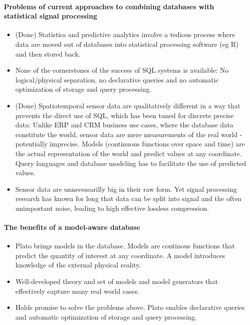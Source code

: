 \paragraph{Problems of current approaches to combining databases with statistical signal processing}
\begin{itemize}
\item (Done) Statistics and predictive analytics involve a tedious process where data are moved out of databases into statistical processing software (eg R) and then stored back.
%
\item None of the cornerstones of the success of SQL systems is available: No logical/physical separation, no declarative queries and no automatic optimization of storage and query processing.
%
\item (Done) Spatiotemporal sensor data are qualitatively different in a way that prevents the direct use of SQL, which has been tuned for discrete precise data: Unlike ERP and CRM business use cases, where the database data constitute the world, sensor data are mere measurements of the real world - potentially imprecise. Models (continuous functions over space and time) are the actual representation of the world and predict values at any coordinate. Query languages and database modeling has to facilitate the use of predicted values.
%
\item Sensor data are unnecessarilly big in their raw form. Yet signal processing research has known for long that data can be split into signal and the often unimportant noise, leading to high effective lossless compression. 
%
\end{itemize}

\paragraph{The benefits of a model-aware database}

\begin{itemize}
%
\item Plato brings models in the database. Models are continous functions that predict the quantity of interest at any coordinate. A model introduces knowledge of the external physical reality.
%
\item Well-developed theory and set of models and model generators that effectively capture many real world cases.
%
\item Holds promise to solve the problems above. Plato enables declarative queries and automatic optimization of storage and query processing.
%
\end{itemize}

